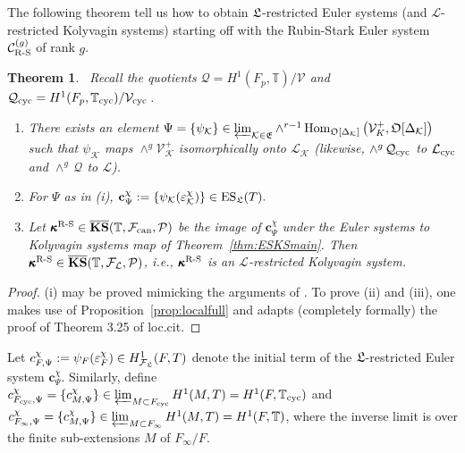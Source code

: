 \documentclass[12pt]{amsart}
\numberwithin{equation}{section}
\newtheorem{thm}{Theorem}[section]
\begin{document}
The following theorem tell us how to obtain $\frak{L}$-restricted Euler systems (and ${\mathcal{L}}$-restricted Kolyvagin systems) starting off with the Rubin-Stark Euler system $\mathcal{C}^{(g)}_{\textup{R-S}}$ of rank $g$.
\begin{thm} $\,$ Recall the quotients $\mathcal{Q}=H^1(F_p,{\mathbb{T}})/\mathcal{V}$ and $\mathcal{Q}_{\textup{cyc}}=H^1(F_p,{\mathbb{T}}_{\textup{cyc}})/\mathcal{V}_{\textup{cyc}}$\,.
\label{thm:ellrestrictedESmain}
\begin{enumerate}
\item[(i)] There exists an element
$\Psi=\{\psi_{\mathcal{K}}\} \in \varprojlim_{{\mathcal{K}} \in \frak{E}} \wedge^{r-1}\,\textup{Hom}_{{\frak{O}}[\Delta_{\mathcal{K}}]}\left(\mathcal{V}_K^+, {\frak{O}}[\Delta_{\mathcal{K}}]\right)$ such that $\psi_{\mathcal{K}}$ maps $\wedge^g \mathcal{V}_{\mathcal{K}}^+$ isomorphically onto ${\mathcal{L}}_{\mathcal{K}}$ (likewise, $\wedge^g\, \mathcal{Q}_{\textup{cyc}}$ to ${\mathcal{L}}_{\textup{cyc}}$ and $\wedge^g\, \mathcal{Q}$ to ${\mathcal{L}}$).
\item[(ii)] For $\Psi$ as in \textup{(i)}, $\textbf{c}^{\chi}_{\Psi}:=\{\psi_{\mathcal{K}}(\varepsilon_{\mathcal{K}}^\chi)\} \in \textup{ES}_{\frak{L}}(T).$
\item[(iii)] Let $\pmb{\kappa}^{\textup{R-S}} \in \overline{\textbf{\textup{KS}}}({\mathbb{T}},{\mathcal{F}_{\textup{\lowercase{can}}}},{\mathcal{P}})$  be the image of $\textbf{c}^{\chi}_{\Psi}$ under the Euler systems to Kolyvagin systems map of Theorem~\ref{thm:ESKSmain}. Then $\pmb{\kappa}^{\textup{R-S}} \in \overline{\textbf{\textup{KS}}}({\mathbb{T}},{\mathcal{F}}_{\mathcal{L}},{\mathcal{P}})$, i.e., $\pmb{\kappa}^{\textup{R-S}}$ is an ${\mathcal{L}}$-restricted Kolyvagin system.
\end{enumerate}
\end{thm}
\begin{proof}
(i) may be proved mimicking the arguments of \cite[\S3.3.1]{kbbesrankr}. To prove (ii) and (iii), one makes use of Proposition~\ref{prop:localfull} and adapts (completely formally) the proof of Theorem 3.25 of loc.cit.
\end{proof}
Let $c_{F,\Psi}^\chi:=\psi_F(\varepsilon_F^\chi)\in H^1_{{\mathcal{F}}_{\frak{L}}}(F,T)$ denote the initial term of the $\frak{L}$-restricted Euler system $\textbf{c}^{\chi}_{\Psi}$. Similarly, define $c_{F_{\textup{cyc}},\Psi}^\chi=\{c_{M,\Psi}^{\chi}\} \in \varprojlim_{M\subset F_{\textup{cyc}}} H^1(M,T)=H^1(F,{\mathbb{T}}_{\textup{cyc}})$ and $c_{F_\infty,\Psi}^\chi=\{c_{M,\Psi}^{\chi}\} \in \varprojlim_{M\subset F_\infty} H^1(M,T)=H^1(F,{\mathbb{T}})$, where the inverse limit is over the finite sub-extensions $M$ of $F_{\infty}/F$.
\end{document}
